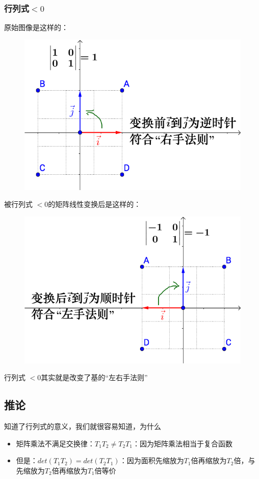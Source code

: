 \documentclass[12pt]{article}
\begin{document}
\subsubsection{行列式$<0$}

原始图像是这样的：
\begin{figure}[H]
\centering
\includegraphics[width=.5\textwidth]{fig/UnderstandDeterminant_1.png}
\end{figure}

被行列式 $< 0$的矩阵线性变换后是这样的：
\begin{figure}[H]
\centering
\includegraphics[width=.5\textwidth]{fig/UnderstandDeterminant_2.png}
\end{figure}

行列式 $< 0$其实就是改变了基的“左右手法则”

\subsection{推论}
知道了行列式的意义，我们就很容易知道，为什么
\begin{itemize}
    \item 矩阵乘法不满足交换律：$T_1T_2 \neq T_2T_1$：因为矩阵乘法相当于复合函数
    \item 但是：$det(T_1T_2) = det(T_2T_1)$：因为面积先缩放为$T_1$倍再缩放为$T_2$倍，与先缩放为$T_2$倍再缩放为$T_1$倍等价
\end{itemize}
\end{document}
